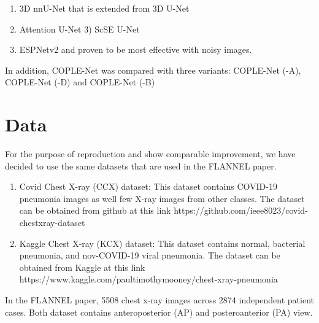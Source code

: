 \documentclass{sigkddExp}
\begin{document}
\begin{enumerate}
    \item 3D nnU-Net that is extended from 3D U-Net
    \item Attention U-Net 3) ScSE U-Net
    \item ESPNetv2 and proven to be most effective with noisy images.
\end{enumerate}

In addition, COPLE-Net was compared with three variants: COPLE-Net (-A), COPLE-Net (-D)
and COPLE-Net (-B) 

%

\section{Data}

For the purpose of reproduction and show comparable improvement, we have decided
to use the same datasets that are used in the FLANNEL paper.

\begin{enumerate}
    \item Covid Chest X-ray (CCX) dataset: This dataset contains COVID-19 pneumonia images 
    as well few X-ray images from other classes. The dataset can be obtained from 
    github at this link   
    https://github.com/ieee8023/covid-chestxray-dataset
    
    \item Kaggle Chest X-ray (KCX) dataset: This dataset contains normal, bacterial pneumonia, 
    and nov-COVID-19 viral pneumonia. The dataset can be obtained from Kaggle at this 
    link
    https://www.kaggle.com/paultimothymooney/chest-xray-pneumonia
\end{enumerate}


In the FLANNEL paper, 5508 chest x-ray images across 2874 independent patient
cases. Both dataset contains anteroposterior (AP) and posteroanterior (PA) view.
\end{document}
